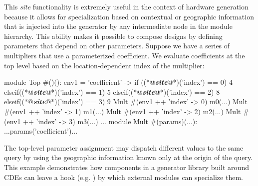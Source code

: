 This \emph{site} functionality is extremely useful in the context of hardware generation because it allows for specialization based on contextual or geographic information that is injected into the generator by any intermediate node in the module hierarchy.
This ability makes it possible to compose designs by defining parameters that depend on other parameters. Suppose we have a series of multipliers that use a parameterized coefficient. We evaluate coefficients at the top level based on the location-dependent index of the multiplier:

\begin{phdl}
module Top #()():
  env1 = {'coefficient' -> if    ((*@\textcolor[rgb]{1,0.5,0}{\textbf{\textit{site}}}@*)('index') == 0) 4 
                           elseif((*@\textcolor[rgb]{1,0.5,0}{\textbf{\textit{site}}}@*)('index') == 1) 5
                           elseif((*@\textcolor[rgb]{1,0.5,0}{\textbf{\textit{site}}}@*)('index') == 2) 8
                           elseif((*@\textcolor[rgb]{1,0.5,0}{\textbf{\textit{site}}}@*)('index') == 3) 9}                        
  Mult #(env1 ++ {'index' -> 0}) m0(...)
  Mult #(env1 ++ {'index' -> 1}) m1(...)
  Mult #(env1 ++ {'index' -> 2}) m2(...)
  Mult #(env1 ++ {'index' -> 3}) m3(...) ...
module Mult #(params)(...):
  ...params('coefficient')...
\end{phdl}

The top-level parameter assignment may dispatch different values to the same query by using the geographic information known only at the origin of the query. 
This example demonstrates how components in a generator library built around CDEs can leave a hook (e.g. ) by which external modules can specialize them.




